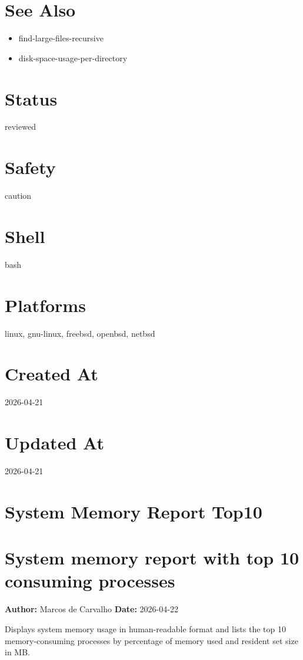 \documentclass[openany]{book}
\begin{document}
\section*{See Also}
\begin{itemize}
  \item find-large-files-recursive
  \item disk-space-usage-per-directory
\end{itemize}

\section*{Status}
reviewed

\section*{Safety}
caution

\section*{Shell}
bash

\section*{Platforms}
linux, gnu-linux, freebsd, openbsd, netbsd

\section*{Created At}
2026-04-21

\section*{Updated At}
2026-04-21

\section{System Memory Report Top10}
\section*{System memory report with top 10 consuming processes}
\textbf{Author:} Marcos de Carvalho \hfill \textbf{Date:} 2026-04-22

\noindent Displays system memory usage in human-readable format and lists the top 10 memory-consuming processes by percentage of memory used and resident set size in MB.
\end{document}
